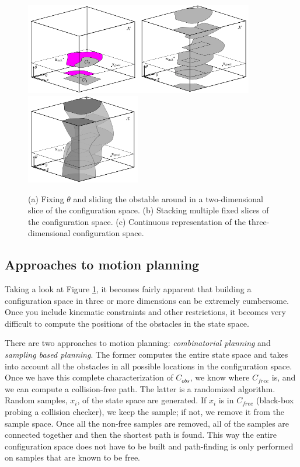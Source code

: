 \documentclass[twoside]{article}
\begin{document}
\begin{figure}[h!]
  \centering
  \includegraphics[width=50mm]{3Dslide1.PNG}\includegraphics[width=50mm]{3Dslide2.PNG}\includegraphics[width=50mm]{3Dslide3.PNG}
  \caption{(a) Fixing $\theta$ and sliding the obstable around in a two-dimensional slice of the configuration space. (b) Stacking multiple fixed slices of the configuration space. (c) Continuous representation of the three-dimensional configuration space.}
  \label{fig:3Dslide}
\end{figure}

\subsection{Approaches to motion planning}

Taking a look at Figure \ref{fig:3Dslide}, it becomes fairly apparent that building a configuration space in three or more dimensions can be extremely cumbersome. Once you include kinematic constraints and other restrictions, it becomes very difficult to compute the positions of the obstacles in the state space.

There are two approaches to motion planning: \textit{combinatorial planning} and \textit{sampling based planning}. The former computes the entire state space and takes into account all the obstacles in all possible locations in the configuration space. Once we have this complete characterization of $C_{obs}$, we know where $C_{free}$ is, and we can compute a collision-free path. The latter is a randomized algorithm. Random samples, $x_i$, of the state space are generated. If $x_i$ is in $C_{free}$ (black-box probing a collision checker), we keep the sample; if not, we remove it from the sample space. Once all the non-free samples are removed, all of the samples are connected together and then the shortest path is found. This way the entire configuration space does not have to be built and path-finding is only performed on samples that are known to be free.
\end{document}
